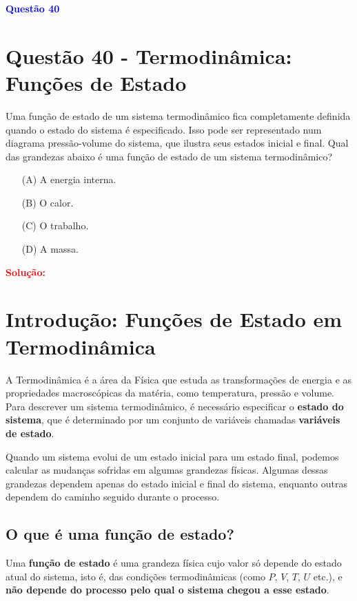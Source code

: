 \documentclass[a4paper,12pt]{article}
\begin{document}
\begin{flushleft}
\textbf{\textcolor{blue}{\Large Quest\~ao 40}}\\
\noindent
\section{Quest\~ao 40 - Termodinâmica: Funções de Estado}
Uma função de estado de um sistema termodinâmico fica
completamente definida quando o estado do sistema é
especificado. Isso pode ser representado num diagrama
pressão-volume do sistema, que ilustra seus estados inicial
e final. Qual das grandezas abaixo é uma função de estado
de um sistema termodinâmico?

\begin{itemize}
\item[(A)] A energia interna.
\item[(B)] O calor.
\item[(C)] O trabalho.
\item[(D)] A massa.
\end{itemize}

\vspace{0.5cm}

\textcolor{red}{\textbf{Solução:}}\\

\section*{Introdução: Funções de Estado em Termodinâmica}

A Termodinâmica é a área da Física que estuda as transformações de energia e as propriedades macroscópicas da matéria, como temperatura, pressão e volume. Para descrever um sistema termodinâmico, é necessário especificar o \textbf{estado do sistema}, que é determinado por um conjunto de variáveis chamadas \textbf{variáveis de estado}.

Quando um sistema evolui de um estado inicial para um estado final, podemos calcular as mudanças sofridas em algumas grandezas físicas. Algumas dessas grandezas dependem apenas do estado inicial e final do sistema, enquanto outras dependem do caminho seguido durante o processo.

\subsection*{O que é uma função de estado?}

Uma \textbf{função de estado} é uma grandeza física cujo valor só depende do estado atual do sistema, isto é, das condições termodinâmicas (como \(P\), \(V\), \(T\), \(U\) etc.), e \textbf{não depende do processo pelo qual o sistema chegou a esse estado}.


\end{flushleft}
\end{document}
